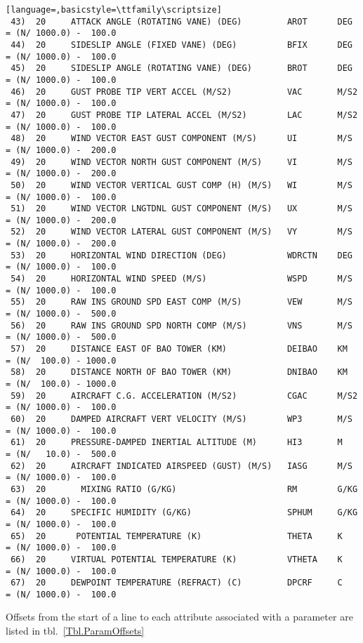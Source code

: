 \documentclass{report}
\begin{document}
\begin{lstlisting}[language=,basicstyle=\ttfamily\scriptsize]
 43)  20     ATTACK ANGLE (ROTATING VANE) (DEG)         AROT      DEG     = (N/ 1000.0) -  100.0
 44)  20     SIDESLIP ANGLE (FIXED VANE) (DEG)          BFIX      DEG     = (N/ 1000.0) -  100.0
 45)  20     SIDESLIP ANGLE (ROTATING VANE) (DEG)       BROT      DEG     = (N/ 1000.0) -  100.0
 46)  20     GUST PROBE TIP VERT ACCEL (M/S2)           VAC       M/S2    = (N/ 1000.0) -  100.0
 47)  20     GUST PROBE TIP LATERAL ACCEL (M/S2)        LAC       M/S2    = (N/ 1000.0) -  100.0
 48)  20     WIND VECTOR EAST GUST COMPONENT (M/S)      UI        M/S     = (N/ 1000.0) -  200.0
 49)  20     WIND VECTOR NORTH GUST COMPONENT (M/S)     VI        M/S     = (N/ 1000.0) -  200.0
 50)  20     WIND VECTOR VERTICAL GUST COMP (H) (M/S)   WI        M/S     = (N/ 1000.0) -  100.0
 51)  20     WIND VECTOR LNGTDNL GUST COMPONENT (M/S)   UX        M/S     = (N/ 1000.0) -  200.0
 52)  20     WIND VECTOR LATERAL GUST COMPONENT (M/S)   VY        M/S     = (N/ 1000.0) -  200.0
 53)  20     HORIZONTAL WIND DIRECTION (DEG)            WDRCTN    DEG     = (N/ 1000.0) -  100.0
 54)  20     HORIZONTAL WIND SPEED (M/S)                WSPD      M/S     = (N/ 1000.0) -  100.0
 55)  20     RAW INS GROUND SPD EAST COMP (M/S)         VEW       M/S     = (N/ 1000.0) -  500.0
 56)  20     RAW INS GROUND SPD NORTH COMP (M/S)        VNS       M/S     = (N/ 1000.0) -  500.0
 57)  20     DISTANCE EAST OF BAO TOWER (KM)            DEIBAO    KM      = (N/  100.0) - 1000.0
 58)  20     DISTANCE NORTH OF BAO TOWER (KM)           DNIBAO    KM      = (N/  100.0) - 1000.0
 59)  20     AIRCRAFT C.G. ACCELERATION (M/S2)          CGAC      M/S2    = (N/ 1000.0) -  100.0
 60)  20     DAMPED AIRCRAFT VERT VELOCITY (M/S)        WP3       M/S     = (N/ 1000.0) -  100.0
 61)  20     PRESSURE-DAMPED INERTIAL ALTITUDE (M)      HI3       M       = (N/   10.0) -  500.0
 62)  20     AIRCRAFT INDICATED AIRSPEED (GUST) (M/S)   IASG      M/S     = (N/ 1000.0) -  100.0
 63)  20       MIXING RATIO (G/KG)                      RM        G/KG    = (N/ 1000.0) -  100.0
 64)  20     SPECIFIC HUMIDITY (G/KG)                   SPHUM     G/KG    = (N/ 1000.0) -  100.0
 65)  20      POTENTIAL TEMPERATURE (K)                 THETA     K       = (N/ 1000.0) -  100.0
 66)  20     VIRTUAL POTENTIAL TEMPERATURE (K)          VTHETA    K       = (N/ 1000.0) -  100.0
 67)  20     DEWPOINT TEMPERATURE (REFRACT) (C)         DPCRF     C       = (N/ 1000.0) -  100.0
\end{lstlisting}

Offsets from the start of a line to each attribute associated with a parameter are listed in tbl.~\ref{Tbl.ParamOffsets}
\end{document}
